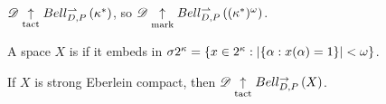 \documentclass[11pt]{article}
\begin{document}
  \begin{example}
    $\mathscr{D}\underset{\text{tact}}{\uparrow} Bell_{D,P}^{\rightharpoonup}\left({\kappa^*}\right)$,
    so $\mathscr{D}\underset{\text{mark}}{\uparrow} Bell_{D,P}^{\rightharpoonup}\left({(\kappa^*)^\omega}\right)$.
  \end{example}







  \begin{definition}
    A space $X$ is  if it embeds in
    $\sigma2^{\kappa}=\{x\in2^\kappa:|\{\alpha:x(\alpha)=1\}|<\omega\}$.
  \end{definition}

  \begin{theorem}
    If $X$ is strong Eberlein compact, then
    $\mathscr{D}\underset{\text{tact}}{\uparrow}Bell_{D,P}^{\to}\left({X}\right)$.
  \end{theorem}
\end{document}

